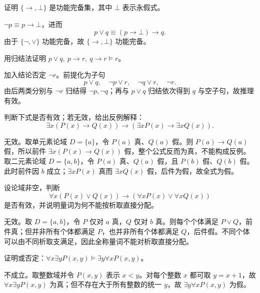 \begin{exercise}[level=advanced]
证明 $\{\to,\bot\}$ 是功能完备集，其中 $\bot$ 表示永假式。
\begin{solution}
$\neg p\equiv p\to\bot$，进而
\[
p\lor q\equiv(p\to\bot)\to q.
\]
由于 $\{\neg,\lor\}$ 功能完备，故 $\{\to,\bot\}$ 功能完备。
\end{solution}
\end{exercise}

\begin{exercise}[level=advanced]
用归结法证明 $p\lor q,\ p\to r,\ q\to r\vDash r$。
\begin{solution}
加入结论否定 $\neg r$。前提化为子句
\[
p\lor q,\quad\neg p\lor r,\quad\neg q\lor r,\quad\neg r.
\]
由后两类分别与 $\neg r$ 归结得 $\neg p,\neg q$；再与 $p\lor q$ 归结依次得到 $q$ 与空子句，故推理有效。
\end{solution}
\end{exercise}

\begin{exercise}[level=advanced]
判断下式是否有效；若无效，给出反例解释：
\[
\exists x(P(x)\to Q(x))\to(\exists xP(x)\to\exists xQ(x)).
\]
\begin{solution}
无效。取单元素论域 $D=\{a\}$，令 $P(a)$ 真、$Q(a)$ 假。则 $P(a)\to Q(a)$ 假，所以前件 $\exists x(P(x)\to Q(x))$ 假，整个公式反而为真，不能构成反例。取二元素论域 $D=\{a,b\}$，令 $P(a)$ 真、$Q(a)$ 假，且 $P(b)$ 假、$Q(b)$ 假。此时前件因 $b$ 成立；$\exists xP(x)$ 真而 $\exists xQ(x)$ 假，后件为假，故全式为假。
\end{solution}
\end{exercise}

\begin{exercise}[level=advanced]
设论域非空，判断
\[
\forall x(P(x)\lor Q(x))\to(\forall xP(x)\lor\forall xQ(x))
\]
是否有效，并说明量词为何不能按析取直接分配。
\begin{solution}
无效。取 $D=\{a,b\}$，令 $P$ 仅对 $a$ 真，$Q$ 仅对 $b$ 真。则每个个体满足 $P\lor Q$，前件真；但并非所有个体都满足 $P$，也并非所有个体都满足 $Q$，后件假。不同个体可以由不同析取支满足，因此全称量词不能对析取直接分配。
\end{solution}
\end{exercise}

\begin{exercise}[level=advanced]
证明或否定：$\forall x\exists yP(x,y)\vDash\exists y\forall xP(x,y)$。
\begin{solution}
不成立。取整数域并令 $P(x,y)$ 表示 $x<y$。对每个整数 $x$ 都可取
$y=x+1$，故 $\forall x\exists yP(x,y)$ 为真；但不存在大于所有整数的统一
$y$，故 $\exists y\forall xP(x,y)$ 为假。
\end{solution}
\end{exercise}

